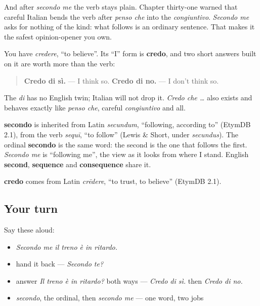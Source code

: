 And after \emph{secondo me} the verb stays plain. Chapter thirty-one warned that careful Italian bends the verb after \emph{penso che} into the \emph{congiuntivo}. \emph{Secondo me} asks for nothing of the kind: what follows is an ordinary sentence. That makes it the safest opinion-opener you own.

\begin{grammarlens}[title={Grammar Lens: credo di sì}]
You have \emph{credere}, \textquotedblleft{}to believe\textquotedblright{}. Its \textquotedblleft{}I\textquotedblright{} form is \textbf{credo}, and two short answers built on it are worth more than the verb:

\begin{quote}
\textbf{Credo di sì.} — I think so. \textbf{Credo di no.} — I don't think so.
\end{quote}

The \emph{di} has no English twin; Italian will not drop it. \emph{Credo che …} also exists and behaves exactly like \emph{penso che}, careful \emph{congiuntivo} and all.
\end{grammarlens}

\begin{cousinweb}
\textbf{secondo} is inherited from Latin \emph{secundum}, \textquotedblleft{}following, according to\textquotedblright{} (EtymDB 2.1), from the verb \emph{sequī}, \textquotedblleft{}to follow\textquotedblright{} (Lewis \& Short, under \emph{secundus}). The ordinal \textbf{secondo} is the same word: the second is the one that follows the first. \emph{Secondo me} is \textquotedblleft{}following me\textquotedblright{}, the view as it looks from where I stand. English \textbf{second}, \textbf{sequence} and \textbf{consequence} share it.

\textbf{credo} comes from Latin \emph{crēdere}, \textquotedblleft{}to trust, to believe\textquotedblright{} (EtymDB 2.1).
\end{cousinweb}

\subsection*{Your turn}
Say these aloud:

\begin{itemize}
\raggedright
  \item \emph{Secondo me il treno è in ritardo.}
  \item hand it back — \emph{Secondo te?}
  \item answer \emph{Il treno è in ritardo?} both ways — \emph{Credo di sì.} then \emph{Credo di no.}
  \item \emph{secondo}, the ordinal, then \emph{secondo me} — one word, two jobs
\end{itemize}

